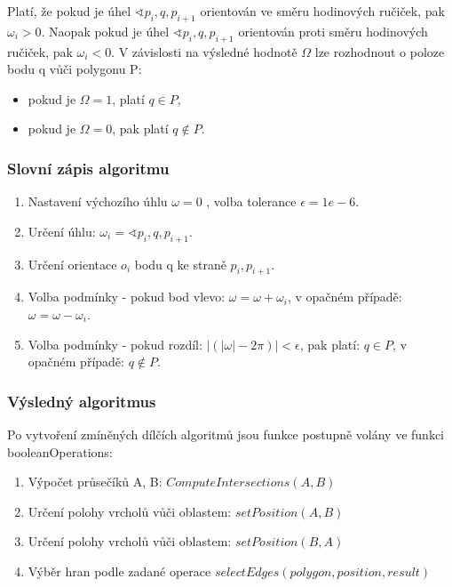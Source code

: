 \documentclass[a4paper,11pt,twoside]{article}
\begin{document}
\noindent Platí, že pokud je úhel $\sphericalangle p_i, q, p_{i+1}$ orientován ve směru hodinových ručiček, pak $\omega_i > 0$.
Naopak pokud je úhel $\sphericalangle p_i, q, p_{i+1}$ orientován proti směru hodinových ručiček, pak $\omega_i < 0$.
V závislosti na výsledné hodnotě $\Omega$ lze rozhodnout o poloze bodu q vůči polygonu P:

\begin{itemize}
\item pokud je $\Omega = 1$, platí $q \in P$, 
\item pokud je $\Omega = 0$, pak platí $q { \not \in } P$.
\end{itemize}

\subsubsection{Slovní zápis algoritmu}
\begin{enumerate}
\item Nastavení výchozího úhlu $\omega = 0$ , volba tolerance $\epsilon = 1e-6$.
\item Určení úhlu: $\omega_i = \sphericalangle p_i, q, p_{i+1}$.
\item Určení orientace $o_i$ bodu q ke straně $p_i, p_{i+1}$.
\item Volba podmínky - pokud bod vlevo: $\omega = \omega + \omega_i$, v opačném případě: $\omega = \omega - \omega_i$.
\item Volba podmínky - pokud rozdíl: $|(|\omega| - 2\pi)| < \epsilon$, pak platí: $q \in P$, v opačném případě:  $ q { \not \in } P $.
\end{enumerate}

\subsubsection{Výsledný algoritmus}
Po vytvoření zmíněných dílčích algoritmů jsou funkce postupně volány ve funkci booleanOperations:
\begin{enumerate}
\item Výpočet průsečíků A, B: $ComputeIntersections(A, B)$
\item Určení polohy vrcholů vůči oblastem: $setPosition(A, B) $
\item Určení polohy vrcholů vůči oblastem: $setPosition(B, A) $
\item Výběr hran podle zadané operace $selectEdges(polygon, position, result)$
\end{enumerate}
\end{document}
